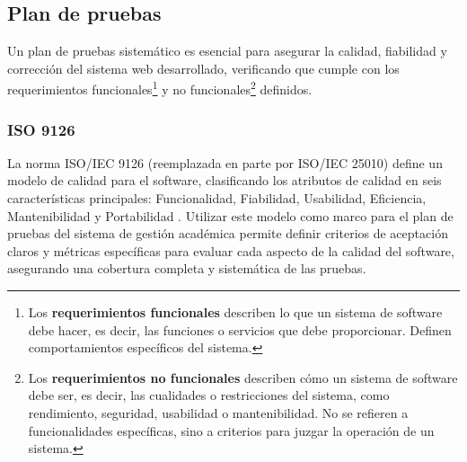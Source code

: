 \subsection{Plan de pruebas}
Un plan de pruebas sistemático es esencial para asegurar la calidad, fiabilidad y corrección del sistema web desarrollado, verificando que cumple con los requerimientos funcionales\footnote{Los \textbf{requerimientos funcionales} describen lo que un sistema de software debe hacer, es decir, las funciones o servicios que debe proporcionar.
Definen comportamientos específicos del sistema.} y no funcionales\footnote{Los \textbf{requerimientos no funcionales} describen cómo un sistema de software debe ser, es decir, las cualidades o restricciones del sistema, como rendimiento, seguridad, usabilidad o mantenibilidad.
No se refieren a funcionalidades específicas, sino a criterios para juzgar la operación de un sistema.} definidos.

\subsubsection{ISO 9126}
La norma ISO/IEC 9126 (reemplazada en parte por ISO/IEC 25010) define un modelo de calidad para el software, clasificando los atributos de calidad en seis características principales: Funcionalidad, Fiabilidad, Usabilidad, Eficiencia, Mantenibilidad y Portabilidad \parencite{ISO9126}.
Utilizar este modelo como marco para el plan de pruebas del sistema de gestión académica permite definir criterios de aceptación claros y métricas específicas para evaluar cada aspecto de la calidad del software, asegurando una cobertura completa y sistemática de las pruebas.
